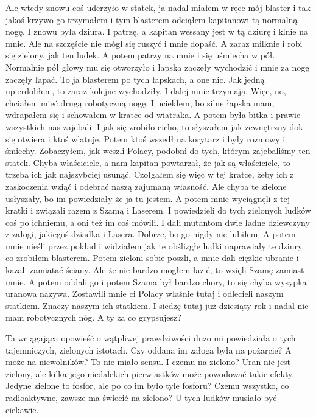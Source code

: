 \begin{poem}
	Ale wtedy znowu coś uderzyło w statek, ja nadal miałem w ręce mój blaster i tak jakoś krzywo go trzymałem i tym blasterem odciąłem kapitanowi tą normalną nogę. I znowu była dziura.
	I patrzę, a kapitan wessany jest w tą dziurę i klnie na mnie. Ale na szczęście nie mógł się ruszyć i mnie dopaść.
	A zaraz milknie i robi się zielony, jak ten ludek.
	A potem patrzy na mnie i się uśmiecha w pół. Normalnie pół głowy mu się otworzyło i łapska zaczęły wychodzić i mnie za nogę zaczęły łapać. 
	To ja blasterem po tych łapskach, a one nic. Jak jedną upierdoliłem, to zaraz kolejne wychodziły. I dalej mnie trzymają.
	Więc, no, chciałem mieć drugą robotyczną nogę.
	I uciekłem, bo silne łapska mam, wdrapałem się i schowałem w kratce od wiatraka.
	A potem była bitka i prawie wszystkich nas zajebali.
	I jak się zrobiło cicho, to słyszałem jak zewnętrzny dok się otwiera i ktoś wlatuje.
	Potem ktoś wszedł na korytarz i były rozmowy i śmiechy.
	Zobaczyłem, jak weszli Polacy, podobni do tych, którym zajebaliśmy ten statek. Chyba właściciele, a nam kapitan powtarzał, że jak są właściciele, to trzeba ich jak najszybciej usunąć.
	Czołgałem się więc w tej kratce, żeby ich z zaskoczenia wziąć i odebrać naszą zajumaną własność.
	Ale chyba te zielone usłyszały, bo im powiedziały że ja tu jestem.
	A potem mnie wyciągnęli z tej kratki i związali razem z Szamą i Laserem.
	I powiedzieli do tych zielonych ludków coś po ichniemu, a oni też im coś mówili. I dali mutantom dwie ładne dziewczyny z załogi, jakiegoś dziadka i Lasera.
	Dobrze, bo go nigdy nie lubiłem.
	A potem mnie nieśli przez pokład i widziałem jak te obślizgłe ludki naprawiały te dziury, co zrobiłem blasterem.
	Potem zieloni sobie poszli, a mnie dali ciężkie ubranie i kazali zamiatać ściany. Ale że nie bardzo mogłem łazić, to wzięli Szamę zamiast mnie.
	A potem oddali go i potem Szama był bardzo chory, to się chyba wysypka uranowa nazywa.
	Zostawili mnie ci Polacy właśnie tutaj i odlecieli naszym statkiem. Znaczy naszym ich statkiem.
	I siedzę tutaj już dziesiąty rok i nadal nie mam robotycznych nóg. A ty za co grypsujesz?
\end{poem}

Ta wciągająca opowieść o wątpliwej prawdziwości dużo mi powiedziała o tych tajemniczych, zielonych istotach.
Czy oddana im załoga była na pożarcie? A może na niewolników? To nie miało sensu.
I czemu na zielono? Uran nie jest zielony, ale kilka jego niedalekich pierwiastków może powodować takie efekty.
Jedyne zielone to fosfor, ale po co im było tyle fosforu? Czemu wszystko, co radioaktywne, zawsze ma świecić na zielono?
U tych ludków musiało być ciekawie.

